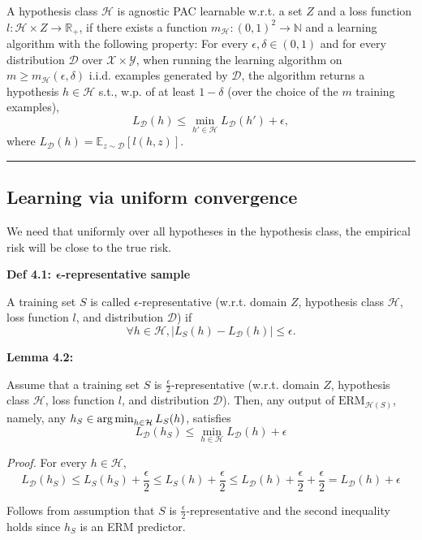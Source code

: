 A hypothesis class $\mathcal{H}$ is agnostic PAC learnable w.r.t. a set $Z$ and a loss function $l: \mathcal{H} \times Z \rightarrow \mathbb{R}_+$, if there exists a function $m_{\mathcal{H}}: (0, 1)^2 \rightarrow \mathbb{N}$ and a learning algorithm with the following property: For every $\epsilon, \delta \in (0, 1)$ and for every distribution $\mathcal{D}$ over $\mathcal{X} \times \mathcal{Y}$, when running the learning algorithm on $m \geq m_{\mathcal{H}}(\epsilon, \delta)$ i.i.d. examples generated by $\mathcal{D}$, the algorithm returns a hypothesis $h \in \mathcal{H}$ s.t., w.p. of at least $1 - \delta$ (over the choice of the $m$ training examples), 
$$L_{\mathcal{D}}(h) \leq \min_{h' \in \mathcal{H}} L_{\mathcal{D}}(h') + \epsilon,$$
where $L_{\mathcal{D}}(h) = \mathbb{E}_{z \sim \mathcal{D}}[l(h, z)]$.

\hrule height 0.06pt
\medskip

\subsection{Learning via uniform convergence}

We need that uniformly over all hypotheses in the hypothesis class, the empirical risk will be close to the true risk.

\textbf{Def 4.1: $\mathbf{\epsilon}$-representative sample}

A training set $S$ is called $\epsilon$-representative (w.r.t. domain $Z$, hypothesis class $\mathcal{H}$, loss function $l$, and distribution $\mathcal{D}$) if 
$$\forall h \in \mathcal{H}, |L_S(h) - L_{\mathcal{D}}(h)| \leq \epsilon.$$

\textbf{Lemma 4.2:}

Assume that a training set $S$ is $\frac{\epsilon}{2}$-representative (w.r.t. domain $Z$, hypothesis class $\mathcal{H}$, loss function $l$, and distribution $\mathcal{D}$). Then, any output of $\textrm{ERM}_{\mathcal{H}(S)}$, namely, any $h_S \in \operatorname*{arg\,min}_{h \in \mathcal{H}} L_S(h)$, satisfies
    $$L_{\mathcal{D}}(h_S) \leq \min_{h \in \mathcal{H}} L_{\mathcal{D}}(h) + \epsilon$$
    
\textit{Proof.} For every $h \in \mathcal{H}$, 
$$L_{\mathcal{D}}(h_S) \leq L_S(h_S) + \frac{\epsilon}{2} \leq L_S(h) + \frac{\epsilon}{2} \leq L_{\mathcal{D}}(h) + \frac{\epsilon}{2} + \frac{\epsilon}{2} = L_{\mathcal{D}}(h) + \epsilon$$

Follows from assumption that $S$ is $\frac{\epsilon}{2}$-representative and the second inequality holds since $h_S$ is an ERM predictor.

